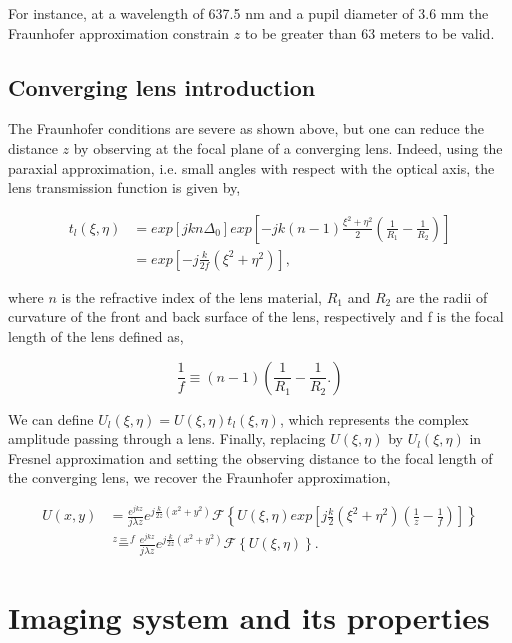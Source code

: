 For instance, at a wavelength of 637.5 nm and a pupil diameter of 3.6 mm the Fraunhofer approximation constrain $z$ to be greater than 63 meters to be valid.

\subsection{Converging lens introduction}
\label{subsec:ConvLensIntro}

The Fraunhofer conditions are severe as shown above, but one can reduce the distance $z$ by observing at the focal plane of a converging lens. Indeed, using the paraxial approximation, i.e. small angles with respect with the optical axis, the lens transmission function is given by,

\begin{align}
t_l(\xi , \eta) &= exp \left[ j k n \Delta_0 \right] exp \left[ -jk \left( n-1 \right)\frac{ \xi^2 + \eta^2 }{2}\left( \frac{1}{R_1} - \frac{1}{R_2}\right) \right] \nonumber \\ 
&= exp \left[ -j \frac{k}{2f} (\xi^2+\eta^2) \right] ,
\label{eqt:lensTl}
\end{align}

where $n$ is the refractive index of the lens material, $R_1$ and $R_2$ are the radii of curvature of the front and back surface of the lens, respectively and f is the focal length of the lens defined as,

\begin{equation}
\frac{1}{f} \equiv (n-1)\left(\frac{1}{R_1}-\frac{1}{R_2}. \right)
\label{eqt:focal_length}
\end{equation}

We can define $U_l(\xi,\eta) = U(\xi,\eta)t_l(\xi,\eta)$, which represents the complex amplitude passing through a lens. Finally, replacing $U(\xi,\eta)$ by $U_l(\xi,\eta)$ in Fresnel approximation and setting the observing distance to the focal length of the converging lens, we recover the Fraunhofer approximation,

\begin{align}
U(x,y) &= \frac{e^{jkz}}{j\lambda z} e^{j\frac{k}{2z}(x^2+y^2)}  \mathcal{F}\left\lbrace U(\xi,\eta) exp\left[j\frac{k}{2}(\xi^2+\eta^2)(\frac{1}{z}-\frac{1}{f})\right]\right\rbrace \nonumber \\
&\overset{z=f}{=} \frac{e^{jkz}}{j\lambda z} e^{j\frac{k}{2z}(x^2+y^2)}  \mathcal{F}\left\lbrace U(\xi,\eta)\right\rbrace.
\end{align}

\section{Imaging system and its properties}
\label{sec:ImwthInst}

